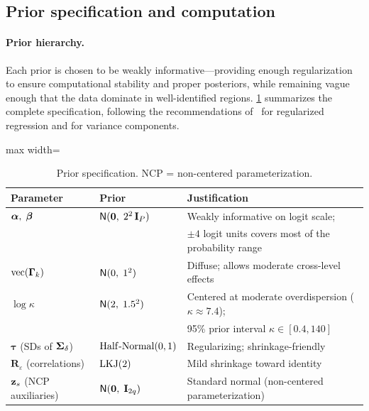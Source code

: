 
\subsection{Prior specification and computation}\label{sec:priors}

\paragraph{Prior hierarchy.}
Each prior is chosen to be weakly informative---providing enough
regularization to ensure computational stability and proper posteriors, while
remaining vague enough that the data dominate in well-identified regions.
\cref{tab:priors} summarizes the complete specification, following the
recommendations of~\citet{GelmanEtAl2008} for regularized regression and
\citet{Gelman2006} for variance components.

\begin{table}[ht]
\centering
\caption{Prior specification. NCP = non-centered parameterization.}\label{tab:priors}
\smallskip
\footnotesize
\begin{adjustbox}{max width=\textwidth}
\begin{tabular}{@{}llp{}@{}}
\toprule
Parameter & Prior & Justification \\
\midrule
$\boldsymbol{\alpha},\;\boldsymbol{\beta}$ & $\textsf{N}(\mathbf{0},\;2^2\,\mathbf{I}_P)$ &
  Weakly informative on logit scale; \\
  & & $\pm 4$ logit units covers most of the probability range \\[3pt]
$\operatorname{vec}(\boldsymbol{\Gamma}_k)$ & $\textsf{N}(0,\;1^2)$ &
  Diffuse; allows moderate cross-level effects \\[3pt]
$\log\kappa$ & $\textsf{N}(2,\;1.5^2)$ &
  Centered at moderate overdispersion ($\kappa \approx 7.4$); \\
  & & 95\% prior interval $\kappa \in [0.4, 140]$ \\[3pt]
$\boldsymbol{\tau}$ (SDs of $\boldsymbol{\Sigma}_\delta$) &
  $\operatorname{Half\text{-}Normal}(0,1)$ &
  Regularizing; shrinkage-friendly \\[3pt]
$\mathbf{R}_\varepsilon$ (correlations) & $\operatorname{LKJ}(2)$ \citep{LewandowskiEtAl2009} &
  Mild shrinkage toward identity \\[3pt]
$\mathbf{z}_s$ (NCP auxiliaries) & $\textsf{N}(\mathbf{0},\;\mathbf{I}_{2q})$ &
  Standard normal (non-centered parameterization) \\
\bottomrule
\end{tabular}
\end{adjustbox}
\end{table}

